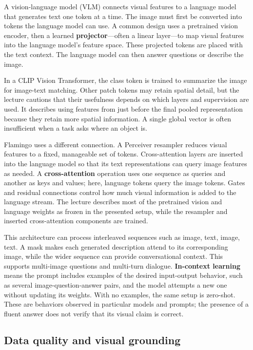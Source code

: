 A vision-language model (VLM) connects visual features to a language model that generates text one token at a time. The image must first be converted into tokens the language model can use. A common design uses a pretrained vision encoder, then a learned \textbf{projector}---often a linear layer---to map visual features into the language model's feature space. These projected tokens are placed with the text context. The language model can then answer questions or describe the image.

In a CLIP Vision Transformer, the class token is trained to summarize the image for image-text matching. Other patch tokens may retain spatial detail, but the lecture cautions that their usefulness depends on which layers and supervision are used. It describes using features from just before the final pooled representation because they retain more spatial information. A single global vector is often insufficient when a task asks where an object is.

Flamingo uses a different connection. A Perceiver resampler reduces visual features to a fixed, manageable set of tokens. Cross-attention layers are inserted into the language model so that its text representations can query image features as needed. A \textbf{cross-attention} operation uses one sequence as queries and another as keys and values; here, language tokens query the image tokens. Gates and residual connections control how much visual information is added to the language stream. The lecture describes most of the pretrained vision and language weights as frozen in the presented setup, while the resampler and inserted cross-attention components are trained.

This architecture can process interleaved sequences such as image, text, image, text. A mask makes each generated description attend to its corresponding image, while the wider sequence can provide conversational context. This supports multi-image questions and multi-turn dialogue. \textbf{In-context learning} means the prompt includes examples of the desired input-output behavior, such as several image-question-answer pairs, and the model attempts a new one without updating its weights. With no examples, the same setup is zero-shot. These are behaviors observed in particular models and prompts; the presence of a fluent answer does not verify that its visual claim is correct.

\subsection{Data quality and visual grounding}\label{04-visual-computing-ii-ch031-data-quality-and-visual-grounding}

